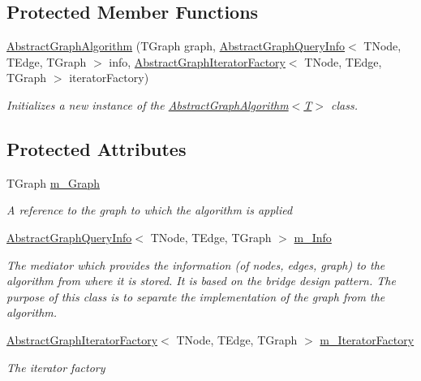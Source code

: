 \subsection*{Protected Member Functions}
\begin{DoxyCompactItemize}
\item 
\hyperlink{class_graph_library_1_1_generics_1_1_abstract_graph_algorithm_aeff19bab0aa2fd277ad17190ac826472}{Abstract\+Graph\+Algorithm} (T\+Graph graph, \hyperlink{class_graph_library_1_1_generics_1_1_abstract_graph_query_info}{Abstract\+Graph\+Query\+Info}$<$ T\+Node, T\+Edge, T\+Graph $>$ info, \hyperlink{class_graph_library_1_1_generics_1_1_abstract_graph_iterator_factory}{Abstract\+Graph\+Iterator\+Factory}$<$ T\+Node, T\+Edge, T\+Graph $>$ iterator\+Factory)
\begin{DoxyCompactList}\small\item\em Initializes a new instance of the \hyperlink{class_graph_library_1_1_generics_1_1_abstract_graph_algorithm_aeff19bab0aa2fd277ad17190ac826472}{Abstract\+Graph\+Algorithm$<$\+T$>$} class. \end{DoxyCompactList}\end{DoxyCompactItemize}
\subsection*{Protected Attributes}
\begin{DoxyCompactItemize}
\item 
T\+Graph \hyperlink{class_graph_library_1_1_generics_1_1_abstract_graph_algorithm_a11916e5c10f7a5b827c3ad8425becdf3}{m\+\_\+\+Graph}
\begin{DoxyCompactList}\small\item\em A reference to the graph to which the algorithm is applied \end{DoxyCompactList}\item 
\hyperlink{class_graph_library_1_1_generics_1_1_abstract_graph_query_info}{Abstract\+Graph\+Query\+Info}$<$ T\+Node, T\+Edge, T\+Graph $>$ \hyperlink{class_graph_library_1_1_generics_1_1_abstract_graph_algorithm_ad93dc80869889f95dd6588d6a07703d7}{m\+\_\+\+Info}
\begin{DoxyCompactList}\small\item\em The mediator which provides the information (of nodes, edges, graph) to the algorithm from where it is stored. It is based on the bridge design pattern. The purpose of this class is to separate the implementation of the graph from the algorithm. \end{DoxyCompactList}\item 
\hyperlink{class_graph_library_1_1_generics_1_1_abstract_graph_iterator_factory}{Abstract\+Graph\+Iterator\+Factory}$<$ T\+Node, T\+Edge, T\+Graph $>$ \hyperlink{class_graph_library_1_1_generics_1_1_abstract_graph_algorithm_a1f64fc66f6f6ccef709df92d3e6081b2}{m\+\_\+\+Iterator\+Factory}
\begin{DoxyCompactList}\small\item\em The iterator factory \end{DoxyCompactList}\end{DoxyCompactItemize}


